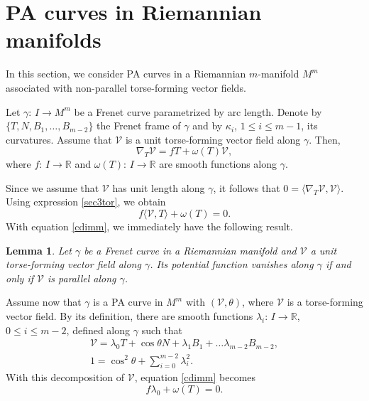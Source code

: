 \documentclass[12pt]{amsart}
\def\r{\mathbb R}
\def\v{\mathcal V}
\newtheorem{lemma}[theorem]{Lemma}
\theoremstyle{definition}
\begin{document}
\section{PA curves in Riemannian manifolds} \label{sechig}

In this section, we consider PA curves in a Riemannian $m$-manifold $M^m$ associated with non-parallel torse-forming vector fields. 

Let $\gamma:\,I\to M^m$ be a Frenet curve parametrized by arc length. Denote by $\{T,N,B_1,\ldots,B_{m-2}\}$ the Frenet frame of $\gamma$ and by $\kappa_i$, $1\leq i \leq m-1$, its curvatures. Assume that $\v$ is a unit torse-forming vector field along $\gamma$. Then,
\begin{equation}
\nabla_T\v=fT+\omega(T)\v, \label{sec3tor}
\end{equation}
where $f:\,I\to \r$ and $\omega(T):\,I\to \r$ are smooth functions along $\gamma$.

Since we assume that $\v$ has unit length along $\gamma$, it follows that $0=\langle \nabla_T\v,\v\rangle$. Using expression \eqref{sec3tor}, we obtain
\begin{equation}
f\langle \v, T\rangle+\omega(T)=0. \label{cdimm}
\end{equation}
With equation \eqref{cdimm}, we immediately have the following result.

\begin{lemma}\label{consleng}
Let $\gamma $ be a Frenet curve in a Riemannian manifold and $\v$ a unit torse-forming vector field along $\gamma$. Its potential function vanishes along $\gamma$ if and only if $\v$ is parallel along $\gamma$.
\end{lemma}

Assume now that $\gamma$ is a PA curve in $M^m$ with $(\v,\theta)$, where $\v$ is a torse-forming vector field. By its definition, there are smooth functions $\lambda_i:\,I\to \r$, $0\leq i \leq m-2$, defined along $\gamma$ such that
\begin{equation}
\left. 
\begin{array}{l}
\v=\lambda_0 T+\cos\theta N+\lambda_1 B_1+\ldots \lambda_{m-2}B_{m-2}, \\ 
1=\cos^2\theta+\sum_{i=0}^{m-2}\lambda_i^2.
\end{array}%
\right. \label{trs41}
\end{equation}
With this decomposition of $\v$, equation \eqref{cdimm} becomes
\begin{equation}
f\lambda_0+\omega(T)=0. \label{cdimm2}
\end{equation}
\end{document}
